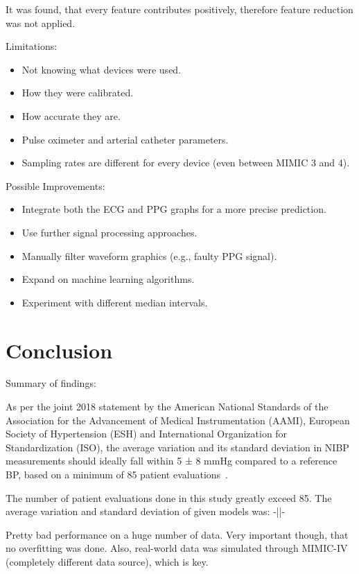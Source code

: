 \documentclass[12pt, bibliography=totoc]{scrartcl}
\begin{document}
    It was found, that every feature contributes positively, therefore feature reduction was not applied.

    Limitations:
    \begin{itemize}
        \item Not knowing what devices were used.
        \item How they were calibrated.
        \item How accurate they are.
        \item Pulse oximeter and arterial catheter parameters.
        \item Sampling rates are different for every device (even between MIMIC 3 and 4).
    \end{itemize}

    Possible Improvements:
    \begin{itemize}
        \item Integrate both the ECG and PPG graphs for a more precise prediction.
        \item Use further signal processing approaches.
        \item Manually filter waveform graphics (e.g., faulty PPG signal).
        \item Expand on machine learning algorithms.
        \item Experiment with different median intervals.
    \end{itemize}


    \section{Conclusion}
    \label{sec:conclusion}

    Summary of findings:

    As per the joint 2018 statement by the American National Standards of the Association for the Advancement of Medical Instrumentation (AAMI), European Society of Hypertension (ESH)
    and International Organization for Standardization (ISO), the average variation and its standard deviation in NIBP measurements should ideally fall within 5 ± 8 mmHg compared to a reference BP,
    based on a minimum of 85 patient evaluations~\cite{stergiouUniversalStandardValidation2018}.

    The number of patient evaluations done in this study greatly exceed 85.
    The average variation and standard deviation of given models was: -||-

    Pretty bad performance on a huge number of data.
    Very important though, that no overfitting was done.
    Also, real-world data was simulated through MIMIC-IV (completely different data source), which is key.
\end{document}
